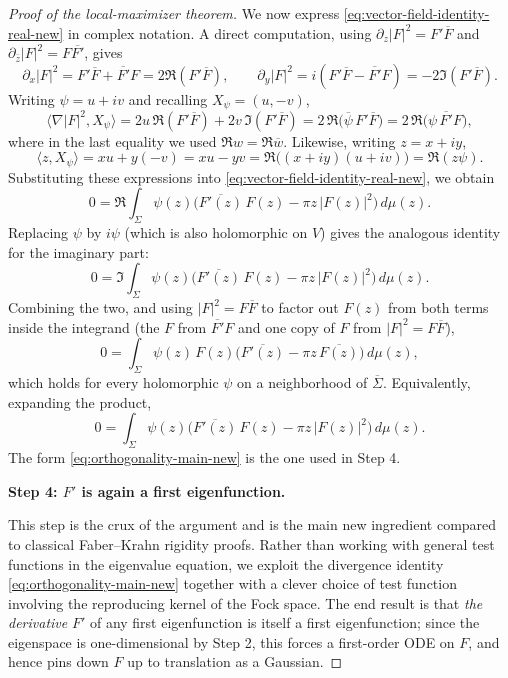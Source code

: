 \documentclass[a4paper,11pt,reqno]{amsart}
\numberwithin{equation}{section}
\theoremstyle{plain} %
\theoremstyle{definition} %
\theoremstyle{remark}
\begin{document}
\begin{proof}[Proof of the local-maximizer theorem]
We now express \eqref{eq:vector-field-identity-real-new} in complex notation.
A direct computation, using \(\partial_z|F|^2=F'\overline F\) and
\(\partial_{\bar z}|F|^2=F\overline{F'}\), gives
\[
\partial_x |F|^2 = F'\overline F+\overline{F'}F = 2\Re(F'\overline F),
\qquad
\partial_y |F|^2 = i(F'\overline F-\overline{F'}F) = -2\Im(F'\overline F).
\]
Writing \(\psi=u+iv\) and recalling \(X_\psi=(u,-v)\),
\[
\langle \nabla |F|^2,X_\psi\rangle
=
2u\,\Re(F'\overline F)+2v\,\Im(F'\overline F)
=
2\,\Re\!\big(\overline{\psi}\,F'\overline F\big)
=
2\,\Re\!\big(\psi\,\overline{F'}F\big),
\]
where in the last equality we used \(\Re w=\Re\overline w\). Likewise, writing
\(z=x+iy\),
\[
\langle z,X_\psi\rangle
=
xu+y(-v)
=
xu-yv
=
\Re\big((x+iy)(u+iv)\big)
=
\Re(z\psi).
\]
Substituting these expressions into
\eqref{eq:vector-field-identity-real-new}, we obtain
\[
0=
\Re\!\int_\Sigma
\psi(z)\Big(\overline{F'(z)}\,F(z)-\pi z\,|F(z)|^2\Big)\,d\mu(z).
\]
Replacing \(\psi\) by \(i\psi\) (which is also holomorphic on \(V\)) gives the
analogous identity for the imaginary part:
\[
0=
\Im\!\int_\Sigma
\psi(z)\Big(\overline{F'(z)}\,F(z)-\pi z\,|F(z)|^2\Big)\,d\mu(z).
\]
Combining the two, and using \(|F|^2=F\overline F\) to factor out \(F(z)\)
from both terms inside the integrand (the \(F\) from \(\overline{F'}F\) and
one copy of \(F\) from \(|F|^2=F\overline F\)),
\begin{equation}\label{eq:orthogonality-main-new}
0=
\int_\Sigma
\psi(z)\,F(z)\Big(\overline{F'(z)}-\pi z\,\overline{F(z)}\Big)\,d\mu(z),
\end{equation}
which holds for every holomorphic \(\psi\) on a neighborhood of
\(\overline \Sigma\). Equivalently, expanding the product,
\begin{equation*}
0=
\int_\Sigma
\psi(z)\Big(\overline{F'(z)}\,F(z)-\pi z\,|F(z)|^2\Big)\,d\mu(z).
\end{equation*}
The form \eqref{eq:orthogonality-main-new} is the one used in Step 4.

\medskip
\noindent
{\bf Step 4: \(F'\) is again a first eigenfunction.}

This step is the crux of the argument and is the main new ingredient compared
to classical Faber--Krahn rigidity proofs. Rather than working with general
test functions in the eigenvalue equation, we exploit the divergence identity
\eqref{eq:orthogonality-main-new} together with a clever choice of test
function involving the reproducing kernel of the Fock space. The end result is
that \emph{the derivative} \(F'\) of any first eigenfunction is itself a first
eigenfunction; since the eigenspace is one-dimensional by Step 2, this forces
a first-order ODE on \(F\), and hence pins down \(F\) up to translation as a
Gaussian.


\end{proof}
\end{document}

